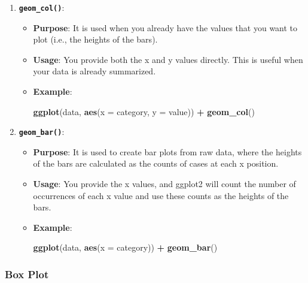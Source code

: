 \documentclass[
]{book}
\newenvironment{Shaded}{\begin{snugshade}}{\end{snugshade}}
\newcommand{\AttributeTok}[1]{\textcolor[rgb]{0.13,0.29,0.53}{#1}}
\newcommand{\FunctionTok}[1]{\textcolor[rgb]{0.13,0.29,0.53}{\textbf{#1}}}
\newcommand{\NormalTok}[1]{#1}
\newcommand{\SpecialCharTok}[1]{\textcolor[rgb]{0.81,0.36,0.00}{\textbf{#1}}}
\begin{document}
\begin{enumerate}
\def\labelenumi{\arabic{enumi}.}
\item
  \textbf{\texttt{geom\_col()}}:

  \begin{itemize}
  \item
    \textbf{Purpose}: It is used when you already have the values that you want to plot (i.e., the heights of the bars).
  \item
    \textbf{Usage}: You provide both the x and y values directly. This is useful when your data is already summarized.
  \item
    \textbf{Example}:

\begin{Shaded}
\begin{Highlighting}[]
\FunctionTok{ggplot}\NormalTok{(data, }\FunctionTok{aes}\NormalTok{(}\AttributeTok{x =}\NormalTok{ category, }\AttributeTok{y =}\NormalTok{ value)) }\SpecialCharTok{+}
  \FunctionTok{geom\_col}\NormalTok{()}
\end{Highlighting}
\end{Shaded}
  \end{itemize}
\item
  \textbf{\texttt{geom\_bar()}}:

  \begin{itemize}
  \item
    \textbf{Purpose}: It is used to create bar plots from raw data, where the heights of the bars are calculated as the counts of cases at each x position.
  \item
    \textbf{Usage}: You provide the x values, and ggplot2 will count the number of occurrences of each x value and use these counts as the heights of the bars.
  \item
    \textbf{Example}:

\begin{Shaded}
\begin{Highlighting}[]
\FunctionTok{ggplot}\NormalTok{(data, }\FunctionTok{aes}\NormalTok{(}\AttributeTok{x =}\NormalTok{ category)) }\SpecialCharTok{+}
  \FunctionTok{geom\_bar}\NormalTok{()}
\end{Highlighting}
\end{Shaded}
  \end{itemize}
\end{enumerate}

\hypertarget{box-plot}{%
\subsubsection*{Box Plot}\label{box-plot}}
\end{document}
